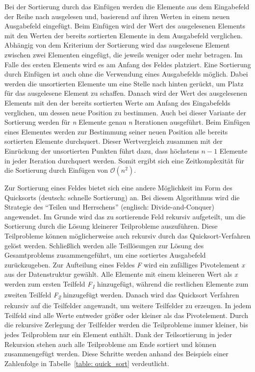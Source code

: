 Bei der Sortierung durch das Einfügen werden die Elemente aus dem Eingabefeld der Reihe nach ausgelesen und, basierend  auf ihren Werten in einem neuen Ausgabefeld eingefügt. Beim Einfügen wird der Wert des ausgelesenen Elements mit den Werten der bereits sortierten Elemente in dem Ausgabefeld verglichen. Abhängig von dem Kriterium der Sortierung wird das ausgelesene Element zwischen zwei Elementen eingefügt, die jeweils weniger oder mehr betragen. Im Falle des ersten Elements wird es am Anfang des Feldes platziert. Eine Sortierung durch Einfügen ist auch ohne die Verwendung eines Ausgabefelds möglich. Dabei werden die unsortierten Elemente um eine Stelle nach hinten gerückt, um Platz für das ausgelesene Element zu schaffen. Danach wird der Wert des ausgelesenen Elements mit den der bereits sortierten Werte am Anfang des Eingabefelds verglichen, um dessen neue Position zu bestimmen. Auch bei dieser Variante der Sortierung werden für \textit{n} Elemente genau \textit{n} Iterationen ausgeführt. Beim Einfügen eines Elementes werden zur Bestimmung seiner neuen Position alle bereits sortierten Elemente durchquert. Dieser Wertvergleich zusammen mit der Einrückung der unsortierten Punkten führt dazu, dass höchstens \textit{$n-1$} Elemente in jeder Iteration durchquert werden. Somit ergibt sich eine Zeitkomplexität für die Sortierung durch Einfügen von $\mathcal{O}(n^2)$. \autocite[157]{sanders_sequential_2019} \autocite[210-211]{hubwieser_fundamente_2015}

Zur Sortierung eines Feldes bietet sich eine andere Möglichkeit im Form des Quicksorts (deutsch: schnelle Sortierung) an. Bei diesem Algorithmus wird die Strategie des \enquote{Teilen und Herrschens} (englisch: Divide-and-Conquer) angewendet. Im Grunde wird das zu sortierende Feld rekursiv aufgeteilt, um die Sortierung durch die Lösung kleinerer Teilprobleme auszuführen. Diese Teilprobleme können möglicherweise auch rekursiv durch das Quicksort-Verfahren gelöst werden. Schließlich werden alle Teillösungen zur Lösung des Gesamtproblems zusammengeführt, um eine sortiertes Ausgabefeld zurückzugeben. Zur Aufteilung eines Feldes \textit{F} wird ein zufälliges Pivotelement \textit{x} aus der Datenstruktur gewählt. Alle Elemente mit einem kleineren Wert als \textit{x} werden zum ersten Teilfeld \textit{F\textsubscript{1}} hinzugefügt, während die restlichen Elemente zum zweiten Teilfeld \textit{F\textsubscript{2}} hinzugefügt werden. Danach wird das Quicksort Verfahren rekursiv auf die Teilfelder angewandt, um weitere Teilfelder zu erzeugen. In jedem Teilfeld sind alle Werte entweder größer oder kleiner als das Pivotelement. Durch die rekursive Zerlegung der Teilfelder werden die Teilprobleme immer kleiner, bis jedes Teilproblem nur ein Element enthält. Dank der Teilsortierung in jeder Rekursion stehen auch alle Teilprobleme am Ende sortiert und können zusammengefügt werden. Diese Schritte werden anhand des Beispiels einer Zahlenfolge in Tabelle~\ref{table: quick_sort} verdeutlicht. \autocite[76-77]{knebl_algorithmen_2021}

